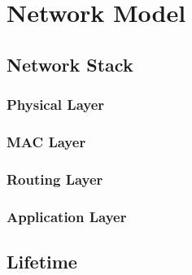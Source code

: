 \chapter{Network Model} %
\label{cha:network_model}

\section{Network Stack} %
\label{sec:network_stack}

\subsection{Physical Layer} %
\label{sub:physical_layer}

\lipsum


\subsection{MAC Layer} %
\label{sub:mac_layer}

\lipsum


\subsection{Routing Layer} %
\label{sub:routing_layer}

\lipsum


\subsection{Application Layer} %
\label{sub:application_layer}

\lipsum



\section{Lifetime} %
\label{sec:lifetime}

\lipsum


